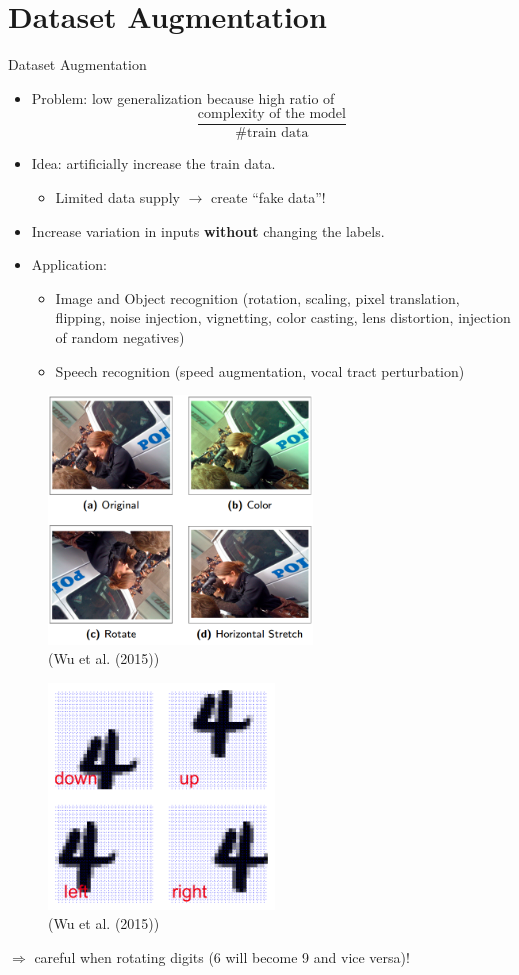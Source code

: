 \section{Dataset Augmentation}
\begin{vbframe}{Dataset Augmentation}
  \begin{itemize}
    \item Problem: low generalization because high ratio of $$\frac{\text{complexity of the model}}{\text{\#train data}}$$
    \item Idea: artificially increase the train data.
      \begin{itemize}
        \item Limited data supply $\rightarrow$ create \enquote{fake data}! 
      \end{itemize}
    \item Increase variation in inputs \textbf{without} changing the labels.
    \item Application:
      \begin{itemize}
        \item Image and Object recognition (rotation, scaling, pixel translation, flipping, noise injection, vignetting, color casting, lens distortion, injection of random negatives)
        \item Speech recognition (speed augmentation, vocal tract perturbation)
      \end{itemize}
  \end{itemize}
\framebreak
  \begin{figure}
    \centering
      \includegraphics[width=7cm]{figure/data_augmentation_1.png}
      \caption{(Wu et al. (2015))}
  \end{figure}
\framebreak
  \begin{figure}
    \centering
      \includegraphics[width=6cm]{figure/data_augmentation_2.png}
      \caption{(Wu et al. (2015))}
  \end{figure}
  $\Rightarrow$ careful when rotating digits (6 will become 9 and vice versa)!
\end{vbframe}
